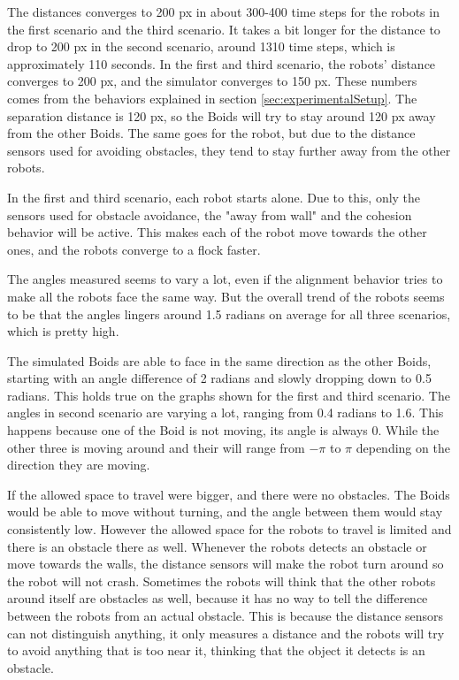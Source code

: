 The distances converges to 200 px in about 300-400 time steps for the robots in the first scenario and the third scenario. It takes a bit longer for the distance to drop to 200 px in the second scenario, around 1310 time steps, which is approximately 110 seconds. In the first and third scenario, the robots' distance converges to 200 px, and the simulator converges to 150 px. These numbers comes from the behaviors explained in section \ref{sec:experimentalSetup}. The separation distance is 120 px, so the Boids will try to stay around 120 px away from the other Boids. The same goes for the robot, but due to the distance sensors used for avoiding obstacles, they tend to stay further away from the other robots. 

In the first and third scenario, each robot starts alone. Due to this, only the sensors used for obstacle avoidance, the "away from wall" and the cohesion behavior will be active. This makes each of the robot move towards the other ones, and the robots converge to a flock faster. 

The angles measured seems to vary a lot, even if the alignment behavior tries to make all the robots face the same way. But the overall trend of the robots seems to be that the angles lingers around 1.5 radians on average for all three scenarios, which is pretty high.

The simulated Boids are able to face in the same direction as the other Boids, starting with an angle difference of 2 radians and slowly dropping down to 0.5 radians. This holds true on the graphs shown for the first and third scenario. The angles in second scenario are varying a lot, ranging from 0.4 radians to 1.6. This happens because one of the Boid is not moving, its angle is always 0. While the other three is moving around and their will range from $-\pi$ to $\pi$ depending on the direction they are moving.

If the allowed space to travel were bigger, and there were no obstacles. The Boids would be able to move without turning, and the angle between them would stay consistently low. However the allowed space for the robots to travel is limited and there is an obstacle there as well.
Whenever the robots detects an obstacle or move towards the walls, the distance sensors will make the robot turn around so the robot will not crash. Sometimes the robots will think that the other robots around itself are obstacles as well, because it has no way to tell the difference between the robots from an actual obstacle. This is because the distance sensors can not distinguish anything, it only measures a distance and the robots will try to avoid anything that is too near it, thinking that the object it detects is an obstacle.


